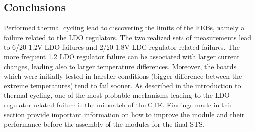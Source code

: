 \subsection{Conclusions}
Performed thermal cycling lead to discovering the limits of the \glspl{FEB}, namely a failure related to the \gls{LDO} regulators. The two realized sets of measurements lead to 6/20 1.2V \gls{LDO} failures and 2/20 1.8V \gls{LDO} regulator-related failures. The more frequent 1.2 \gls{LDO} regulator failure can be associated with larger current changes, leading also to larger temperature differences. Moreover, the boards which were initially tested in harsher conditions (bigger difference between the extreme temperatures) tend to fail sooner. As described in the introduction to thermal cycling, one of the most probable mechanisms leading to the \gls{LDO} regulator-related failure is the mismatch of the \gls{CTE}. Findings made in this section provide important information on how to improve the module and their performance before the assembly of the modules for the final \gls{STS}. 



\newpage
